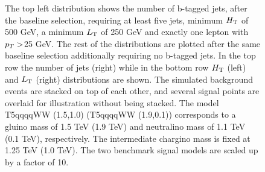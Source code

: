 \begin{figure}[!hbt]
\begin{center}
  \caption{ \label{fig:baselineplots} The top left distribution shows the number of b-tagged jets, after the baseline selection, requiring at least five jets, minimum $H_{\rm T}$ of 500 GeV, a minimum $L_{\rm T}$ of 250 GeV and exactly one lepton with $p_T >$25 GeV. The rest of the distributions are plotted after the same baseline selection additionally requiring no b-tagged jets. In the top row the number of jets (right) while in the bottom row $H_{\rm T}$ (left) and $L_{\rm T}$ (right) distributions are shown. The simulated background events are stacked on top of each other, and several signal points are overlaid for illustration without being stacked. The model T5qqqqWW (1.5,1.0) (T5qqqqWW (1.9,0.1)) corresponds to a gluino mass of 1.5 TeV (1.9 TeV) and neutralino mass of 1.1 TeV (0.1 TeV), respectively. The intermediate chargino mass is fixed at 1.25 TeV (1.0 TeV). The two benchmark signal models are scaled up by a factor of 10.
  }
   \end{center}
\end{figure}
